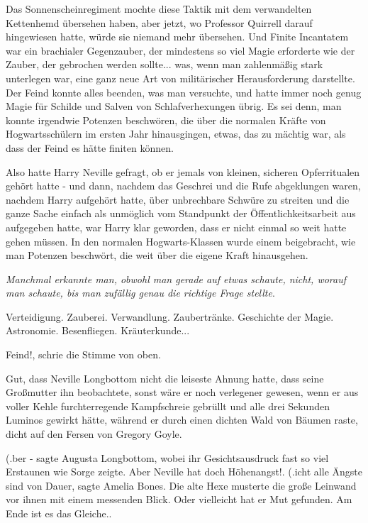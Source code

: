 Das Sonnenscheinregiment mochte diese Taktik mit dem verwandelten Kettenhemd
übersehen haben, aber jetzt, wo Professor Quirrell darauf hingewiesen hatte,
würde sie niemand mehr übersehen. Und Finite Incantatem war ein brachialer
Gegenzauber, der mindestens so viel Magie erforderte wie der Zauber, der
gebrochen werden sollte... was, wenn man zahlenmäßig stark unterlegen war, eine
ganz neue Art von militärischer Herausforderung darstellte. Der Feind konnte
alles beenden, was man versuchte, und hatte immer noch genug Magie für Schilde
und Salven von Schlafverhexungen übrig. Es sei denn, man konnte irgendwie
Potenzen beschwören, die über die normalen Kräfte von Hogwartsschülern im ersten
Jahr hinausgingen, etwas, das zu mächtig war, als dass der Feind es hätte
finiten können.

Also hatte Harry Neville gefragt, ob er jemals von kleinen, sicheren
Opferritualen gehört hatte - und dann, nachdem das Geschrei und die Rufe
abgeklungen waren, nachdem Harry aufgehört hatte, über unbrechbare Schwüre zu
streiten und die ganze Sache einfach als unmöglich vom Standpunkt der
Öffentlichkeitsarbeit aus aufgegeben hatte, war Harry klar geworden, dass er
nicht einmal so weit hatte gehen müssen. In den normalen Hogwarts-Klassen wurde
einem beigebracht, wie man Potenzen beschwört, die weit über die eigene Kraft
hinausgehen.

\emph{Manchmal erkannte man, obwohl man gerade auf etwas schaute, nicht, worauf
man schaute, bis man zufällig genau die richtige Frage stellte}.

Verteidigung. Zauberei. Verwandlung. Zaubertränke. Geschichte der Magie.
Astronomie. Besenfliegen. Kräuterkunde...

\glqq Feind!\grqq{}, schrie die Stimme von oben.

Gut, dass Neville Longbottom nicht die leiseste Ahnung hatte, dass seine
Großmutter ihn beobachtete, sonst wäre er noch verlegener gewesen, wenn er aus
voller Kehle furchterregende Kampfschreie gebrüllt und alle drei Sekunden
Luminos gewirkt hätte, während er durch einen dichten Wald von Bäumen raste,
dicht auf den Fersen von Gregory Goyle.

(\grqq{}.ber -\grqq{} sagte Augusta Longbottom, wobei ihr Gesichtsausdruck fast
so viel Erstaunen wie Sorge zeigte. \glqq Aber Neville hat doch
Höhenangst!\grqq{}. (\grqq{}.icht alle Ängste sind von Dauer\grqq{}, sagte
Amelia Bones. Die alte Hexe musterte die große Leinwand vor ihnen mit einem
messenden Blick. \glqq Oder vielleicht hat er Mut gefunden. Am Ende ist es das
Gleiche.\grqq{}.

